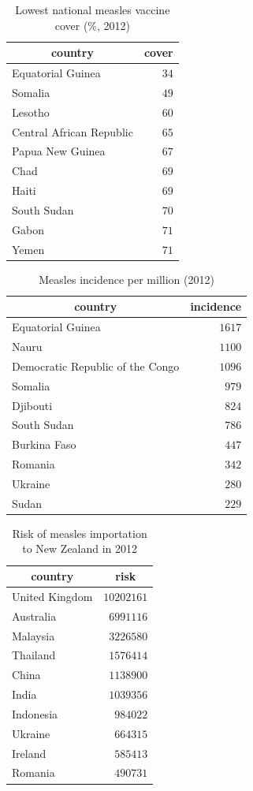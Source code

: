 \documentclass{article}
\begin{document}

\begin{table}
\caption{Lowest national measles vaccine cover (\%, 2012)}
\begin{center}
\begin{tabular}{lr}
\hline\hline
\multicolumn{1}{c}{country}&\multicolumn{1}{c}{cover}\tabularnewline
\hline
Equatorial Guinea&$34$\tabularnewline
Somalia&$49$\tabularnewline
Lesotho&$60$\tabularnewline
Central African Republic&$65$\tabularnewline
Papua New Guinea&$67$\tabularnewline
Chad&$69$\tabularnewline
Haiti&$69$\tabularnewline
South Sudan&$70$\tabularnewline
Gabon&$71$\tabularnewline
Yemen&$71$\tabularnewline
\hline
\end{tabular}\end{center}\label{table:cover12}
\end{table}

\begin{table}
\caption{Measles incidence per million (2012)}
\begin{center}
\begin{tabular}{lr}
\hline\hline
\multicolumn{1}{c}{country}&\multicolumn{1}{c}{incidence}\tabularnewline
\hline
Equatorial Guinea&$1617$\tabularnewline
Nauru&$1100$\tabularnewline
Democratic Republic of the Congo&$1096$\tabularnewline
Somalia&$ 979$\tabularnewline
Djibouti&$ 824$\tabularnewline
South Sudan&$ 786$\tabularnewline
Burkina Faso&$ 447$\tabularnewline
Romania&$ 342$\tabularnewline
Ukraine&$ 280$\tabularnewline
Sudan&$ 229$\tabularnewline
\hline
\end{tabular}\end{center}\label{table:incidence12}
\end{table}

\begin{table}
\caption{Risk of measles importation to New Zealand in 2012}
\begin{center}
\begin{tabular}{lr}
\hline\hline
\multicolumn{1}{c}{country}&\multicolumn{1}{c}{risk}\tabularnewline
\hline
United Kingdom&$10202161$\tabularnewline
Australia&$ 6991116$\tabularnewline
Malaysia&$ 3226580$\tabularnewline
Thailand&$ 1576414$\tabularnewline
China&$ 1138900$\tabularnewline
India&$ 1039356$\tabularnewline
Indonesia&$  984022$\tabularnewline
Ukraine&$  664315$\tabularnewline
Ireland&$  585413$\tabularnewline
Romania&$  490731$\tabularnewline
\hline
\end{tabular}\end{center}\label{table:risk12}
\end{table}
\end{document}
